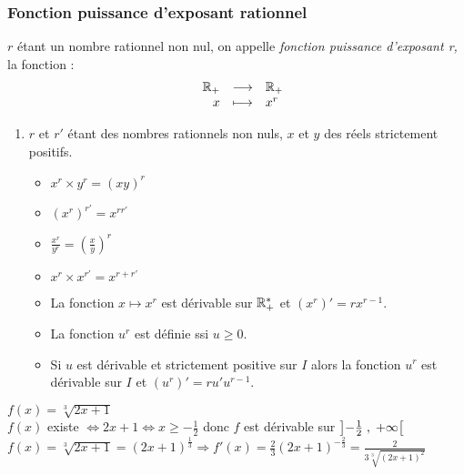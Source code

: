 \subsubsection*{Fonction puissance d'exposant rationnel}
\begin{definition}
$ r $ étant un nombre rationnel non nul, on appelle \emph{fonction puissance d'exposant r,} la fonction : 
\renewcommand{\arraystretch}{1}
\[\begin{array}{lrcl}
    &  \mathbb{R}_+  & \longrightarrow & \mathbb{R}_+ \\ 
  &  x & \longmapsto & x^{r}
   \end{array}\]
\end{definition}
\begin{property}
\begin{enumerate}
\item $ r$ et $r' $ étant des nombres rationnels non nuls, $x $ et $ y$ des réels strictement positifs.
\begin{itemize}
\item $ x^{r}\times y^{r}= (xy)^{r} $ 
\item  $ (x^{r})^{r'}=x^{rr'} $

\item $ \frac{x^{r}}{y^{r}}=(\frac{x}{y})^{r} $
\item   $ x^{r}\times x^{r'}=x^{r+r'} $

\item La fonction $x  \longmapsto x^{r}  $ est dérivable sur $ \mathbb{R}_+^* $ et $( x^{r})'=rx^{r-1}$.
\item La fonction $ u^{r} $ est définie ssi $ u\geq 0. $
  \item   Si $ u $ est dérivable et strictement positive sur $ I $ alors la fonction  $ u^{r} $ est dérivable sur $ I $ et $ (u^{r})'=ru'u^{r-1} $.
 \end{itemize}
 \end{enumerate}
 \end{property}
 \begin{example}
 $ f(x)= \sqrt[3]{2x+1} $\\
 $ f(x) $  existe $ \Leftrightarrow 2x+1 \Leftrightarrow x \geq -\frac{1}{2} $ donc $ f $ est dérivable sur $ \left]-\frac{1}{2} \;,\; +\infty\right[ $\\
  $ f(x)= \sqrt[3]{2x+1}=(2x+1)^{\frac{1}{3}}\Longrightarrow f'(x)=\frac{2}{3}(2x+1)^{-\frac{2}{3}}=\frac{2}{3\sqrt[3]{(2x+1)^2}} $
 \end{example}


